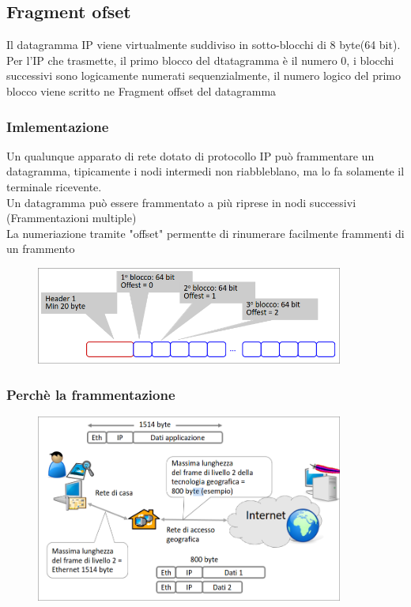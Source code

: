 \documentclass{report}
\begin{document}
        \subsection{Fragment ofset}
            Il datagramma IP viene virtualmente suddiviso in sotto-blocchi di 8 byte(64 bit).
            \\
            Per l'IP che trasmette, il primo blocco del dtatagramma è il numero 0, i blocchi successivi sono logicamente numerati sequenzialmente, il numero logico del primo blocco viene scritto ne Fragment offset del datagramma
            \subsubsection{Imlementazione}
                Un qualunque apparato di rete dotato di protocollo IP può frammentare un datagramma, tipicamente i nodi intermedi non riabbleblano, ma lo fa solamente il terminale ricevente.
                \\
                Un datagramma può essere frammentato a più riprese in nodi successivi (Frammentazioni multiple)
                \\
                La numeriazione tramite "offset" permentte di rinumerare facilmente frammenti di un frammento
                \begin{figure}[H]
                    \includegraphics[width=0.9\textwidth]{1/offset.png}
                \end{figure}
            \subsubsection{Perchè la frammentazione}
                \begin{figure}[H]
                    \includegraphics[width=0.9\textwidth]{1/seg.png}
                \end{figure}
\end{document}

